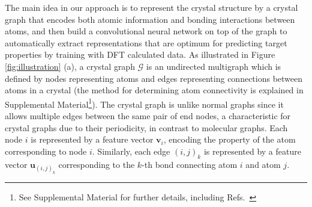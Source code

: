 \documentclass[twocolumn, prl]{revtex4-1}
\begin{document}
The main idea in our approach is to represent the crystal structure by a crystal graph that encodes both atomic information and bonding interactions between atoms, and then build a convolutional neural network on top of the graph to automatically extract representations that are optimum for predicting target properties by training with DFT calculated data. As illustrated in Figure \ref{fig:illustration} (a), a crystal graph $\mathcal{G}$ is an undirected multigraph which is defined by nodes representing atoms and edges representing connections between atoms in a crystal (the method for determining atom connectivity is explained in Supplemental Material\footnote{See Supplemental Material for further details, including Refs.~\cite{sanderson1951interpretation, sanderson1952explanation, cordero2008covalent, kramida2013nist, haynes2014crc, kingma2014adam, srivastava2014dropout, de2015charting, isayev2017universal, blatov2004voronoi}}). The crystal graph is unlike normal graphs since it allows multiple edges between the same pair of end nodes, a characteristic for crystal graphs due to their periodicity, in contrast to molecular graphs. Each node $i$ is represented by a feature vector $\bm{v}_i$, encoding the property of the atom corresponding to node $i$. Similarly, each edge $(i, j)_k$ is represented by a feature vector $\bm{u}_{(i, j)_k}$ corresponding to the $k$-th bond connecting atom $i$ and atom $j$.
\end{document}
